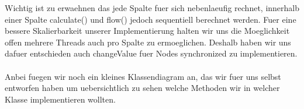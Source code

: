 \documentclass[12pt]{article}
\begin{document}
Wichtig ist zu erwaehnen das jede Spalte fuer sich nebenlaeufig rechnet, innerhalb einer Spalte calculate() und flow() jedoch sequentiell berechnet werden. Fuer eine bessere Skalierbarkeit unserer Implementierung halten wir uns die Moeglichkeit offen mehrere Threads auch pro Spalte zu ermoeglichen. Deshalb haben wir uns dafuer entschieden auch changeValue fuer Nodes synchronized zu implementieren.\\\\

Anbei fuegen wir noch ein kleines Klassendiagram an, das wir fuer uns selbst entworfen haben um uebersichtlich zu sehen welche Methoden wir in welcher Klasse implementieren wollten.

\newpage
\end{document}
